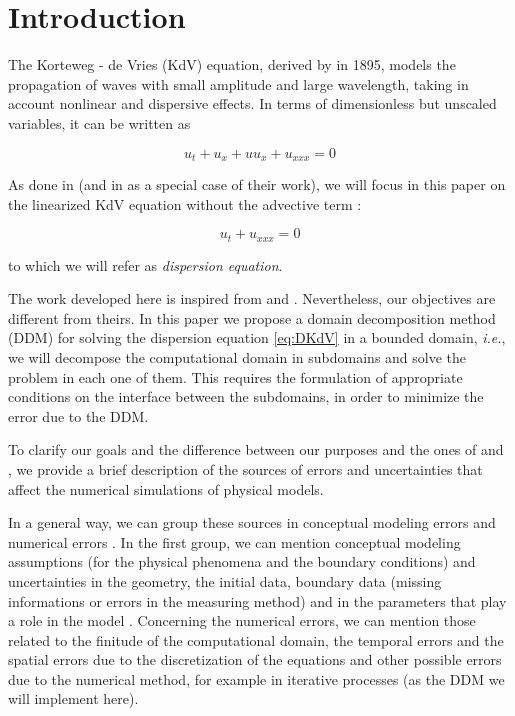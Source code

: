 \section{Introduction}

\indent The Korteweg - de Vries (KdV) equation, derived by \cite{kdv1895} in 1895, models the propagation of waves with small amplitude and large wavelength, taking in account nonlinear and dispersive effects. In terms of dimensionless but unscaled variables, it can be written as \cite{BBM1971}

\begin{equation*}
	u_t + u_x + uu_x + u_{xxx} = 0
\end{equation*}

\indent As done in \cite{zheng2008} (and in \cite{besse2015} as a special case of their work), we will focus in this paper on the linearized KdV equation without the advective term : 

\begin{equation}
 \label{eq:DKdV}
	u_t  + u_{xxx} = 0
\end{equation}

\noindent to which we will refer as \emph{dispersion equation}.

\indent The work developed here is inspired from \cite{zheng2008} and \cite{besse2015}. Nevertheless, our objectives are different from theirs. In this paper we propose a domain decomposition method (DDM) for solving the dispersion equation \eqref{eq:DKdV} in a bounded domain, \emph{i.e.}, we will decompose the computational domain in subdomains and solve the problem in each one of them. This requires the formulation of appropriate conditions on the interface between the subdomains, in order to minimize the error due to the DDM.

\indent To clarify our goals and the difference between our purposes and the ones of \cite{zheng2008} and \cite{besse2015}, we provide a brief description of the sources of errors and uncertainties that affect the numerical simulations of physical models.

\indent In a general way, we can group these sources in conceptual modeling errors and numerical errors \cite{roache1997}. In the first group, we can mention conceptual modeling assumptions (for the physical phenomena and the boundary conditions) and uncertainties in the geometry, the initial data, boundary data (missing informations or errors in the measuring method) and in the parameters that play a role in the model \cite{roache1997,balagurusamy2008}. Concerning the numerical errors, we can mention those related to the finitude of the computational domain, the temporal errors and the spatial errors due to the discretization of the equations  \cite{karniadakis1995,roache1997} and other possible errors due to the numerical method, for example in iterative processes (as the DDM we will implement here).

